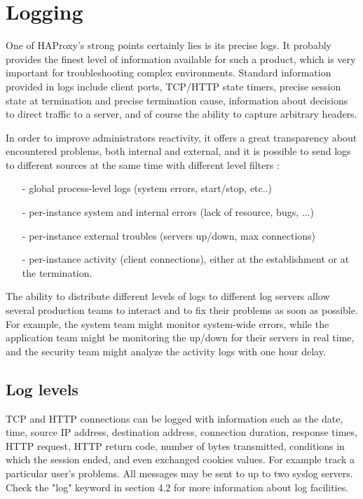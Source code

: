 \chapter{Logging}

One of HAProxy's strong points certainly lies is its precise logs. It probably
provides the finest level of information available for such a product, which is
very important for troubleshooting complex environments. Standard information
provided in logs include client ports, TCP/HTTP state timers, precise session
state at termination and precise termination cause, information about decisions
to direct traffic to a server, and of course the ability to capture arbitrary
headers.

In order to improve administrators reactivity, it offers a great transparency
about encountered problems, both internal and external, and it is possible to
send logs to different sources at the same time with different level filters :

\begin{itemize}
\item[-] global process-level logs (system errors, start/stop, etc..)
\item[-] per-instance system and internal errors (lack of resource, bugs, ...)
\item[-] per-instance external troubles (servers up/down, max connections)
\item[-] per-instance activity (client connections), either at the establishment or
    at the termination.
\end{itemize}

The ability to distribute different levels of logs to different log servers
allow several production teams to interact and to fix their problems as soon
as possible. For example, the system team might monitor system-wide errors,
while the application team might be monitoring the up/down for their servers in
real time, and the security team might analyze the activity logs with one hour
delay.


\section{Log levels}

TCP and HTTP connections can be logged with information such as the date, time,
source IP address, destination address, connection duration, response times,
HTTP request, HTTP return code, number of bytes transmitted, conditions
in which the session ended, and even exchanged cookies values. For example
track a particular user's problems. All messages may be sent to up to two
syslog servers. Check the "log" keyword in section 4.2 for more information
about log facilities.


